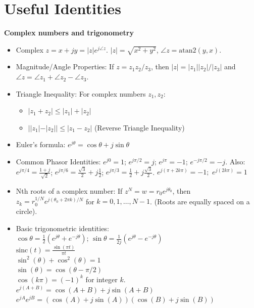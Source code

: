 \documentclass[10pt, twocolumn]{article}
\begin{document}
\section{Useful Identities}
\noindent\textbf{Complex numbers and trigonometry}
\begin{itemize}
    \item Complex $z = x+jy = |z|e^{j\angle z}$. $|z|=\sqrt{x^2+y^2}$, $\angle z = \text{atan2}(y,x)$.
    \item Magnitude/Angle Properties: If $z = z_1 z_2 / z_3$, then $|z| = |z_1||z_2|/|z_3|$ and $\angle z = \angle z_1 + \angle z_2 - \angle z_3$.
    \item Triangle Inequality: For complex numbers $z_1, z_2$:
        \begin{itemize}
            \item $|z_1 + z_2| \le |z_1| + |z_2|$
            \item $||z_1| - |z_2|| \le |z_1 - z_2|$ (Reverse Triangle Inequality)
        \end{itemize}
    \item Euler's formula: $e^{j\theta} = \cos \theta + j \sin \theta$
    \item Common Phasor Identities: $e^{j0}=1$; $e^{j\pi/2}=j$; $e^{j\pi}=-1$; $e^{-j\pi/2}=-j$. Also: $e^{j\pi/4} = \frac{1+j}{\sqrt{2}}$; $e^{j\pi/6} = \frac{\sqrt{3}}{2}+j\frac{1}{2}$; $e^{j\pi/3} = \frac{1}{2}+j\frac{\sqrt{3}}{2}$.
    $e^{j(\pi + 2k\pi)} = -1;$
    $e^{j(2k\pi)} = 1$
    \item Nth roots of a complex number: If $z^N = w = r_0 e^{j\theta_0}$, then $z_k = r_0^{1/N} e^{j(\theta_0 + 2\pi k)/N}$ for $k=0, 1, \dots, N-1$. (Roots are equally spaced on a circle).
    \item Basic trigonometric identities: \\
    $\cos \theta = \frac{1}{2}(e^{j\theta} + e^{-j\theta})$; $\sin\theta = \frac{1}{2j}(e^{j\theta} - e^{-j\theta})$ \\
    $\text{sinc}(t) = \frac{\sin(\pi t)}{\pi t}$ \\
    $\sin^2(\theta) + \cos^2(\theta) = 1$ \\
    $\sin(\theta) = \cos(\theta - \pi/2)$ \\
    $\cos(k\pi) = (-1)^k$ for integer $k$. \\
    $e^{j(A+B)} = \cos(A+B) + j \sin(A+B)$ \\
    $e^{jA}e^{jB} = (\cos(A) + j \sin(A))(\cos(B) + j \sin(B))$ \\

\end{itemize}
\end{document}

